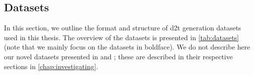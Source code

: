 {%


\subsection{Datasets}
\label{sec:datasets}

In this section, we outline the format and structure of \ac{d2t} generation datasets used in this thesis. The overview of the datasets is presented in \autoref{tab:datasets} (note that we mainly focus on the datasets in boldface). We do not describe here our novel datasets presented in \citet{kasnerMindLabelsDescribing2022} and \citet{kasnerReferenceBasedMetricsAnalyzing2024}; these are described in their respective sections in \autoref{chap:investigating}.

}
